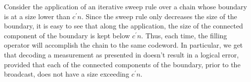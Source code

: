 \begin{remark}
Consider the application of an iterative sweep rule over a chain whose boundary is at a size lower than $c^{\prime} n$. Since the sweep rule only decreases the size of the boundary, it is easy to see that along the application, the size of the connected component of the boundary is kept below $c^{\prime}n$. Thus, each time, the filling operator will accomplish the chain to the same codeword. In particular, we get that decoding a measurement as presented in  doesn't result in a logical error, provided that each of the connected components of the boundary, prior to the broadcast, does not have a size exceeding $c^{\prime}n$.
\end{remark}









